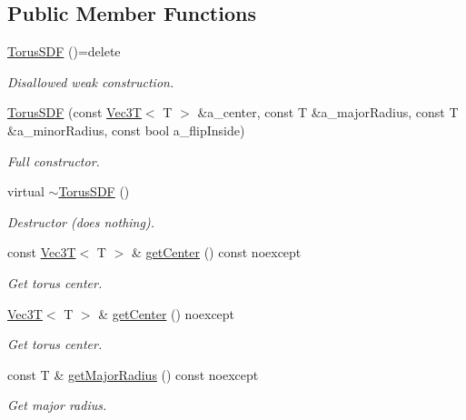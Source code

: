 \subsection*{Public Member Functions}
\begin{DoxyCompactItemize}
\item 
\mbox{\label{classTorusSDF_a4591d7c3cdbbed45fdbaf414f0d096ee}} 
\hyperlink{classTorusSDF_a4591d7c3cdbbed45fdbaf414f0d096ee}{Torus\+S\+DF} ()=delete
\begin{DoxyCompactList}\small\item\em Disallowed weak construction. \end{DoxyCompactList}\item 
\hyperlink{classTorusSDF_acf22c1b59605e93750a3a002fd5bc23a}{Torus\+S\+DF} (const \hyperlink{classVec3T}{Vec3T}$<$ T $>$ \&a\+\_\+center, const T \&a\+\_\+major\+Radius, const T \&a\+\_\+minor\+Radius, const bool a\+\_\+flip\+Inside)
\begin{DoxyCompactList}\small\item\em Full constructor. \end{DoxyCompactList}\item 
\mbox{\label{classTorusSDF_a97178b72cbb9208b7dde0a6db1ab6e18}} 
virtual \hyperlink{classTorusSDF_a97178b72cbb9208b7dde0a6db1ab6e18}{$\sim$\+Torus\+S\+DF} ()
\begin{DoxyCompactList}\small\item\em Destructor (does nothing). \end{DoxyCompactList}\item 
const \hyperlink{classVec3T}{Vec3T}$<$ T $>$ \& \hyperlink{classTorusSDF_a0973ae5f9e4a023ae15728d0a5063b4d}{get\+Center} () const noexcept
\begin{DoxyCompactList}\small\item\em Get torus center. \end{DoxyCompactList}\item 
\hyperlink{classVec3T}{Vec3T}$<$ T $>$ \& \hyperlink{classTorusSDF_ad4a6d109ff640e2cb003901bf6ac1c85}{get\+Center} () noexcept
\begin{DoxyCompactList}\small\item\em Get torus center. \end{DoxyCompactList}\item 
const T \& \hyperlink{classTorusSDF_acf871d02fb580a9c33d6c54517730036}{get\+Major\+Radius} () const noexcept
\begin{DoxyCompactList}\small\item\em Get major radius. \end{DoxyCompactList}\item 

\end{DoxyCompactItemize}
